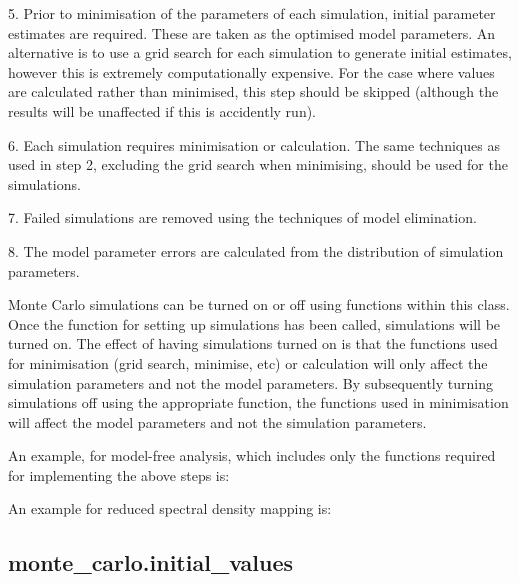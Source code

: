 5.  Prior to minimisation of the parameters of each simulation, initial parameter estimates
are required.  These are taken as the optimised model parameters.  An alternative is to use
a grid search for each simulation to generate initial estimates, however this is extremely
computationally expensive.  For the case where values are calculated rather than minimised,
this step should be skipped (although the results will be unaffected if this is accidently
run).

6.  Each simulation requires minimisation or calculation.  The same techniques as used in
step 2, excluding the grid search when minimising, should be used for the simulations.

7.  Failed simulations are removed using the techniques of model elimination.

8.  The model parameter errors are calculated from the distribution of simulation
parameters.


Monte Carlo simulations can be turned on or off using functions within this class.  Once the
function for setting up simulations has been called, simulations will be turned on.  The
effect of having simulations turned on is that the functions used for minimisation (grid
search, minimise, etc) or calculation will only affect the simulation parameters and not the
model parameters.  By subsequently turning simulations off using the appropriate function,
the functions used in minimisation will affect the model parameters and not the simulation
parameters.


An example, for model-free analysis, which includes only the functions required for
implementing the above steps is:




An example for reduced spectral density mapping is:





\newpage

\subsection{monte\_carlo.initial\_values}


